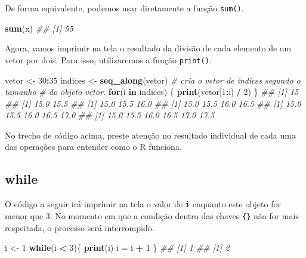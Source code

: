 \documentclass[]{book}
\newenvironment{Shaded}{\begin{snugshade}}{\end{snugshade}}
\newcommand{\CommentTok}[1]{\textcolor[rgb]{0.56,0.35,0.01}{\textit{#1}}}
\newcommand{\ControlFlowTok}[1]{\textcolor[rgb]{0.13,0.29,0.53}{\textbf{#1}}}
\newcommand{\DecValTok}[1]{\textcolor[rgb]{0.00,0.00,0.81}{#1}}
\newcommand{\KeywordTok}[1]{\textcolor[rgb]{0.13,0.29,0.53}{\textbf{#1}}}
\newcommand{\NormalTok}[1]{#1}
\newcommand{\OperatorTok}[1]{\textcolor[rgb]{0.81,0.36,0.00}{\textbf{#1}}}
\newcommand{\StringTok}[1]{\textcolor[rgb]{0.31,0.60,0.02}{#1}}
\begin{document}
De forma equivalente, podemos usar diretamente a função \texttt{sum()}.

\begin{Shaded}
\begin{Highlighting}[]
\KeywordTok{sum}\NormalTok{(x)}
\CommentTok{## [1] 55}
\end{Highlighting}
\end{Shaded}

Agora, vamos imprimir na tela o resultado da divisão de cada elemento de um vetor por dois. Para isso, utilizaremos a função \texttt{print()}.

\begin{Shaded}
\begin{Highlighting}[]
\NormalTok{vetor <-}\StringTok{ }\DecValTok{30}\OperatorTok{:}\DecValTok{35}
\NormalTok{indices <-}\StringTok{ }\KeywordTok{seq_along}\NormalTok{(vetor) }\CommentTok{# cria o vetor de índices segundo o tamanho }
                            \CommentTok{# do objeto vetor.   }
\ControlFlowTok{for}\NormalTok{(i }\ControlFlowTok{in}\NormalTok{ indices) \{}
  \KeywordTok{print}\NormalTok{(vetor[}\DecValTok{1}\OperatorTok{:}\NormalTok{i] }\OperatorTok{/}\StringTok{ }\DecValTok{2}\NormalTok{)}
\NormalTok{\}}
\CommentTok{## [1] 15}
\CommentTok{## [1] 15.0 15.5}
\CommentTok{## [1] 15.0 15.5 16.0}
\CommentTok{## [1] 15.0 15.5 16.0 16.5}
\CommentTok{## [1] 15.0 15.5 16.0 16.5 17.0}
\CommentTok{## [1] 15.0 15.5 16.0 16.5 17.0 17.5}
\end{Highlighting}
\end{Shaded}

No trecho de código acima, preste atenção no resultado individual de cada uma das operações para entender como o R funciona.

\hypertarget{while}{%
\subsection{while}\label{while}}

O código a seguir irá imprimir na tela o valor de \texttt{i} enquanto este objeto for menor que 3. No momento em que a condição dentro das chaves \texttt{\{\}} não for mais respeitada, o processo será interrompido.

\begin{Shaded}
\begin{Highlighting}[]
\NormalTok{i <-}\StringTok{ }\DecValTok{1}
\ControlFlowTok{while}\NormalTok{(i }\OperatorTok{<}\StringTok{ }\DecValTok{3}\NormalTok{)\{}
  \KeywordTok{print}\NormalTok{(i)}
\NormalTok{  i =}\StringTok{ }\NormalTok{i }\OperatorTok{+}\StringTok{ }\DecValTok{1}
\NormalTok{\}}
\CommentTok{## [1] 1}
\CommentTok{## [1] 2}
\end{Highlighting}
\end{Shaded}
\end{document}
